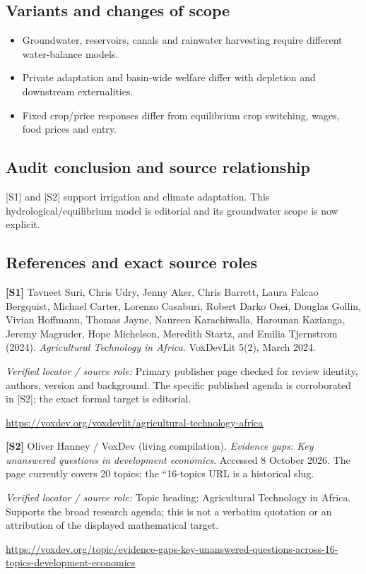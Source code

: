 \documentclass[11pt,a4paper]{article}
\begin{document}
\subsection*{Variants and changes of scope}

\begin{itemize}
\item Groundwater, reservoirs, canals and rainwater harvesting require different water-balance models.
\item Private adaptation and basin-wide welfare differ with depletion and downstream externalities.
\item Fixed crop/price responses differ from equilibrium crop switching, wages, food prices and entry.
\end{itemize}

\subsection*{Audit conclusion and source relationship}

[S1] and [S2] support irrigation and climate adaptation. This hydrological/equilibrium model is editorial and its groundwater scope is now explicit.

\subsection*{References and exact source roles}

{\footnotesize\raggedright
\par\noindent\textbf{[S1]} Tavneet Suri, Chris Udry, Jenny Aker, Chris Barrett, Laura Falcao Bergquist, Michael Carter, Lorenzo Casaburi, Robert Darko Osei, Douglas Gollin, Vivian Hoffmann, Thomas Jayne, Naureen Karachiwalla, Harounan Kazianga, Jeremy Magruder, Hope Michelson, Meredith Startz, and Emilia Tjernstrom (2024). \emph{Agricultural Technology in Africa}. VoxDevLit 5(2), March 2024.\par \textit{Verified locator / source role:} Primary publisher page checked for review identity, authors, version and background. The specific published agenda is corroborated in [S2]; the exact formal target is editorial.\par \url{https://voxdev.org/voxdevlit/agricultural-technology-africa}\par\smallskip
\par\noindent\textbf{[S2]} Oliver Hanney / VoxDev (living compilation). \emph{Evidence gaps: Key unanswered questions in development economics}. Accessed 8 October 2026. The page currently covers 20 topics; the ``16-topics URL is a historical slug.\par \textit{Verified locator / source role:} Topic heading: Agricultural Technology in Africa. Supports the broad research agenda; this is not a verbatim quotation or an attribution of the displayed mathematical target.\par \url{https://voxdev.org/topic/evidence-gaps-key-unanswered-questions-across-16-topics-development-economics}\par\smallskip
}
\end{document}
